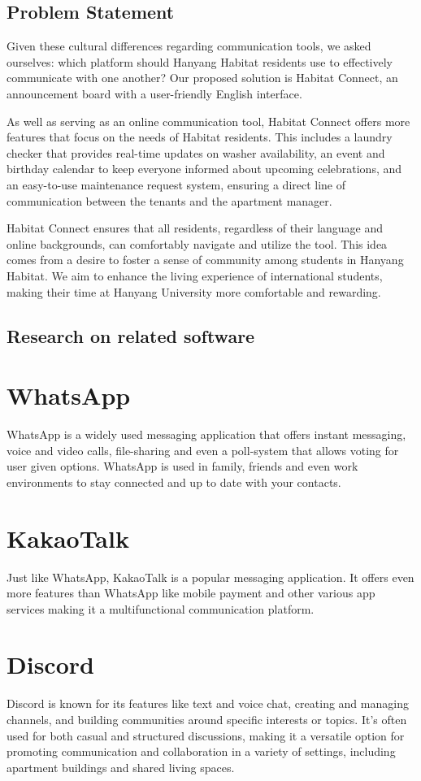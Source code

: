 \documentclass[conference]{IEEEtran}
\begin{document}
\subsection{Problem Statement}
Given these cultural differences regarding communication tools, we asked ourselves: which platform should Hanyang Habitat residents use to effectively communicate with one another? Our proposed solution is Habitat Connect, an announcement board with a user-friendly English interface.

As well as serving as an online communication tool, Habitat Connect offers more features that focus on the needs of Habitat residents. This includes a laundry checker that provides real-time updates on washer availability, an event and birthday calendar to keep everyone informed about upcoming celebrations, and an easy-to-use maintenance request system, ensuring a direct line of communication between the tenants and the apartment manager.

Habitat Connect ensures that all residents, regardless of their language and online backgrounds, can comfortably navigate and utilize the tool. This idea comes from a desire to foster a sense of community among students in Hanyang Habitat. We aim to enhance the living experience of international students, making their time at Hanyang University more comfortable and rewarding.  


\subsection{Research on related software}
\section*{WhatsApp}
WhatsApp is a widely used messaging application that offers instant messaging, voice and video calls, file-sharing and even a poll-system that allows voting for user given options. WhatsApp is used in family, friends and even work environments to stay connected and up to date with your contacts.
\section*{KakaoTalk}
Just like WhatsApp, KakaoTalk is a popular messaging application. It offers even more features than WhatsApp like mobile payment and other various app services making it a multifunctional communication platform.
\section*{Discord}
Discord is known for its features like text and voice chat, creating and managing channels, and building communities around specific interests or topics. It's often used for both casual and structured discussions, making it a versatile option for promoting communication and collaboration in a variety of settings, including apartment buildings and shared living spaces.
\end{document}
